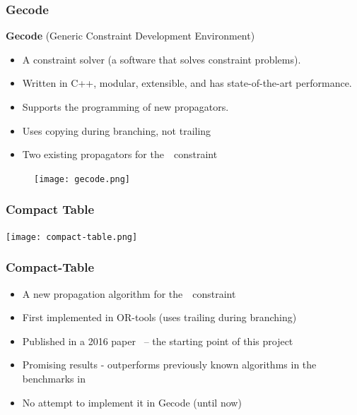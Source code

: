 \documentclass{beamer}
\newcommand{\Table}{\Constraint{Table}}
\newcommand{\CTpaper}[0]{DBLP:conf/cp/DemeulenaereHLP16}
\begin{document}

\begin{frame}

 
  \frametitle{Gecode}
  \textbf{Gecode} (Generic Constraint Development Environment)

  \begin{itemize}
    \item A constraint solver (a software that solves constraint problems).
    \item Written in C++, modular, extensible, and has state-of-the-art performance.
    \item Supports the programming of new propagators.
    \item Uses copying during branching, not trailing
    \item   Two existing propagators for the~\Table~constraint
  \end{itemize}

  
    \begin{figure}[t]
    \begin{center}
      \texttt{[image: gecode.png]}
    \end{center}
  \end{figure}


\end{frame}


\begin{frame}
  \frametitle{Compact Table}
  \texttt{[image: compact-table.png]}
\end{frame}

\begin{frame}
  \frametitle{Compact-Table}
  \begin{itemize}
  \item   A new propagation algorithm for the~\Table~constraint
  \item   First implemented in OR-tools (uses trailing during branching)
  \item   Published in a 2016 paper~\cite{\CTpaper} -- the starting
    point of this project
  \item   Promising results - outperforms previously known algorithms in the
    benchmarks in \cite{\CTpaper}
  \item   No attempt to implement it in Gecode (until now)
  \end{itemize}

\end{frame}
\end{document}
